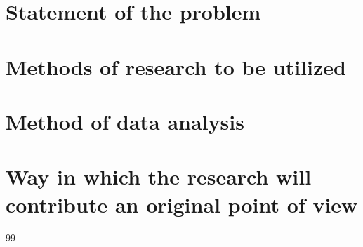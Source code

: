 \documentclass{article}
\begin{document}
\section{Statement of the problem}
\begin{flushleft}
\doublespacing

\end{flushleft}

\section{Methods of research to be utilized}
\noindent
\doublespacing
\begin{flushleft}

\end{flushleft}

\newpage
\section{Method of data analysis}
\noindent
\doublespacing
\begin{flushleft}

\end{flushleft}

\section{Way in which the research will contribute an original point of view}
\noindent
\doublespacing
\begin{flushleft}

\end{flushleft}
\newpage

\begin{thebibliography}{99}
\end{thebibliography}
\end{document}
